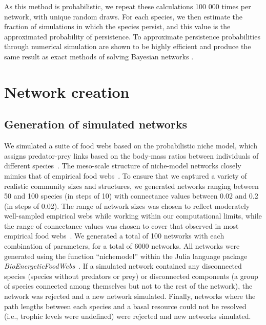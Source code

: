 \documentclass[12pt]{article}
\begin{document}
\begin{spacing}{2.0}
        
        As this method is probabilistic, we repeat these calculations 100 000 times per network, with unique random draws.
        For each species, we then estimate the fraction of simulations in which the species persist, and this value is the approximated probability of persistence.
        To approximate persistence probabilities through numerical simulation are shown to be highly efficient and produce the same result as exact methods of solving Bayesian networks \citep{Haussler2020}.
        
        
\clearpage


\section{Network creation}

    \subsection*{Generation of simulated networks}

        We simulated a suite of food webs based on the probabilistic niche model, which assigns predator-prey links based on the body-mass ratios between individuals of different species~\citep{Williams2000,Delmas2017}. 
        The meso-scale structure of niche-model networks closely mimics that of empirical food webs~\citep{Stouffer2007}. 
        To ensure that we captured a variety of realistic community sizes and structures, we generated networks ranging between 50 and 100 species (in steps of 10) with connectance values between 0.02 and 0.2 (in steps of 0.02). 
        The range of network sizes was chosen to reflect moderately well-sampled empirical webs while working within our computational limits, while the range of connectance values was chosen to cover that observed in most empirical food webs~\citep{Dunne2002e}.
        We generated a total of 100 networks with each combination of parameters, for a total of 6000 networks. 
        All networks were generated using the function ``nichemodel'' within the Julia language package \emph{BioEnergeticFoodWebs}~\citep{bioenergeticfw,Delmas2017}. 
        If a simulated network contained any disconnected species (species without predators or prey) or disconnected components (a group of species connected among themselves but not to the rest of the network), the network was rejected and a new network simulated.
        Finally, networks where the path lengths between each species and a basal resource could not be resolved (i.e., trophic levels were undefined) were rejected and new networks simulated.



\end{spacing}
\end{document}
